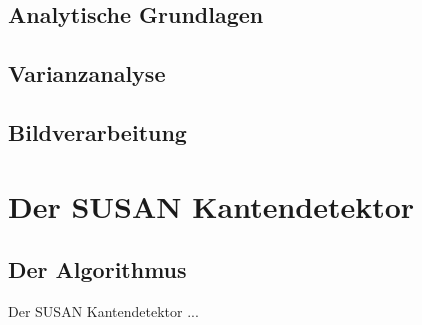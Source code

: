 \documentclass[a4paper, 11pt]{report}
\theoremstyle{definition}
\begin{document}
	\section{Analytische Grundlagen}
	\section{Varianzanalyse}
	\section{Bildverarbeitung}

\chapter{Der SUSAN Kantendetektor}
	\section{Der Algorithmus}\label{sec:thealgorithm}
		Der SUSAN Kantendetektor ...
\end{document}
